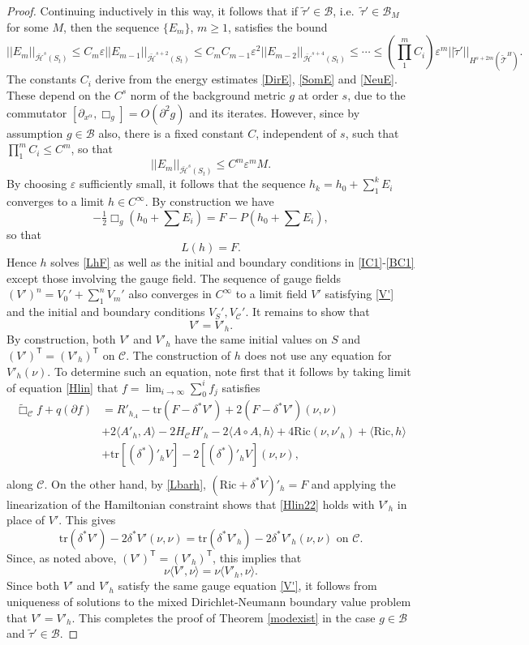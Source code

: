 \documentclass[10pt]{amsart}
\renewcommand{\a}{\alpha}
\renewcommand{\d}{\delta}
\newcommand{\e}{\varepsilon}
\newcommand{\cC}{{\mathcal C}}
\newcommand{\cT}{{\mathcal T}}
\newcommand{\cB}{{\mathcal B}}
\newcommand{\cH}{{\mathcal H}}
\newcommand{\Ric}{\mathrm{Ric}}
\newcommand{\tT}{\mathsf{T}}
\newcommand{\be}{\begin{equation}}
\newcommand{\ee}{\end{equation}}
\newcommand{\tr}{\mathrm{tr}}
\newcommand{\p}{\partial}
\renewcommand{\to}{\rightarrow}
\newcommand{\<}{\langle}
\renewcommand{\>}{\rangle}
\newcommand{\w}{\widetilde}
\theoremstyle{plain}
\theoremstyle{remark}
\theoremstyle{definition}
\numberwithin{equation}{section}
\begin{document}
\begin{proof}
   Continuing inductively in this way, it follows that if $\w \tau' \in \cB$, i.e.~$\w \tau' \in \cB_M$ for some $M$, then the sequence $\{E_m\}$, 
$m \geq 1$, satisfies the bound 
$$||E_m||_{\bar \cH^s(S_t)} \leq C_m\e ||E_{m-1}||_{\bar \cH^{s+2}(S_t)} \leq C_m C_{m-1} \e^2 ||E_{m-2}||_{\bar \cH^{s+4}(S_t)} \leq \cdots \leq 
(\prod_1^m C_i) \e^m ||\w \tau'||_{H^{s+2m}(\w \cT^H)}.$$
The constants $C_i$ derive from the energy estimates \eqref{DirE}, \eqref{SomE} and \eqref{NeuE}. These depend on the $C^s$ norm of the 
background metric $g$ at order $s$, due to the commutator $[\p_{x^{\a}}, \Box_g] = O(\p^2 g)$ and its iterates. However, since by assumption 
$g \in \cB$ also, there is a fixed constant $C$, independent of $s$, such that $\prod_1^m C_i \leq C^m$, so that  
$$||E_m||_{\bar \cH^s(S_t)} \leq C^m \e^m M.$$
By choosing $\e$ sufficiently small, it follows that the sequence $h_k = h_0 + \sum_1^k E_i$ converges to a limit $h \in C^{\infty}$. 
By construction we have 
$$-\tfrac{1}{2}\Box_g(h_0 + \sum E_i)  = F - P(h_0 + \sum E_i),$$
so that 
\be \label{Lbarh}
L(h) = F.
\ee
Hence $h$ solves \eqref{LhF} as well as the initial and boundary conditions in \eqref{IC1}-\eqref{BC1} except those involving the gauge field. The 
sequence of gauge fields $(V')^n  = V_0' + \sum_1^{n}V_m'$ also converges in $C^{\infty}$ to a limit field $V'$ 
satisfying \eqref{V'} and the initial and boundary conditions $V_S', V_{\cC}'$. It remains to show that 
$$V' = V'_h.$$ 
By construction, both $V'$ and $V'_h$ have the same initial values on $S$ and $(V')^{\tT} = (V'_h)^{\tT}$ on $\cC$. The construction of $h$ does not use 
any equation for $V'_h(\nu)$. To determine such an equation, note first that it follows by taking limit of equation \eqref{Hlin} that $f = \lim_{i\to \infty}\sum_0^i f_j$ 
satisfies
\be \label{Hlin22}
\begin{split} 
\w \Box_{\cC} f + q(\p f) & =  R'_{h_A} - \tr(F - \d^* V') + 2(F - \d^* V')(\nu,\nu)\\
 &+2\<A'_h, A\> - 2H_\cC H'_h - 2\<A\circ A, h\> + 4\Ric(\nu,\nu'_h) + \<\Ric, h\>\\
&+ \tr [(\d^*)'_h V] - 2[(\d^*)'_h V](\nu,\nu), \\
\end{split}
\ee
along $\cC$. On the other hand, by \eqref{Lbarh}, $(\Ric + \d^*V)'_h = F$ and applying the linearization of the Hamiltonian constraint shows 
that \eqref{Hlin22} holds with $V'_h$ in place of $V'$. This gives 
$$\tr(\d^*V')-2\d^* V'(\nu,\nu) = \tr(\d^* V'_h) - 2\d^*  V'_h(\nu,\nu) \mbox{ on }\cC.$$
Since, as noted above, $(V')^{\tT} = (V'_h)^{\tT}$, this implies that 
$$\nu \<V', \nu\> = \nu\<V'_h, \nu\>.$$
Since both $V'$ and $V'_h$ satisfy the same gauge equation \eqref{V'}, it follows from uniqueness of solutions to the mixed Dirichlet-Neumann 
boundary value problem that $V' = V'_h$. This completes the proof of Theorem \ref{modexist} in the case $g \in \cB$ and $\w \tau' \in \cB$. 


\end{proof}
\end{document}
